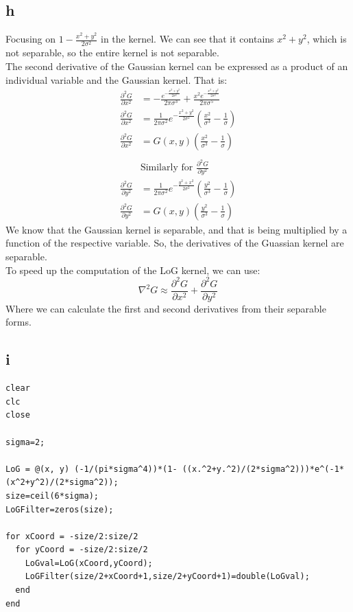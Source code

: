 \documentclass[11pt]{article}
\begin{document}
\subsection{h}
\label{sec:org1105e8e}
Focusing on \(1-\frac{x^2+y^2}{2\sigma^2}\) in the kernel. We can see that it contains \(x^2+y^2\), which is not separable, so the entire kernel is not separable. \\
The second derivative of the Gaussian kernel can be expressed as a product of an individual variable and the Gaussian kernel. That is:
\begin{align*}
\frac{\partial^2 G}{\partial x^2}&=-\frac{e^{-\frac{ x^{2} + y^2}{2 \sigma^{2}}}}{2 \pi \sigma^{3}} + \frac{x^{2} e^{-\frac{ x^{2} + y^2}{2 \sigma^{2}}}}{2 \pi \sigma^{5}} \\
\frac{\partial^2 G}{\partial x^2}&=\frac{1}{2\pi\sigma^2}e^{-\frac{x^2+y^2}{2\sigma^2}} \left( \frac{x^2}{\sigma^3}-\frac{1}{\sigma}\right) \\
\frac{\partial^2 G}{\partial x^2}&=G(x,y)\left( \frac{x^2}{\sigma^3}-\frac{1}{\sigma}\right) \\
& \\
& \textrm{Similarly for } \frac{\partial^2 G}{\partial y^2}\\
\frac{\partial^2 G}{\partial y^2}&=\frac{1}{2\pi\sigma^2}e^{-\frac{y^2+x^2}{2\sigma^2}} \left( \frac{y^2}{\sigma^3}-\frac{1}{\sigma}\right) \\
\frac{\partial^2 G}{\partial y^2}&=G(x,y)\left( \frac{y^2}{\sigma^3}-\frac{1}{\sigma}\right)
\end{align*}
We know that the Gaussian kernel is separable, and that is being multiplied by a function of the respective variable. So, the derivatives of the Guassian kernel are separable.\\
To speed up the computation of the LoG kernel, we can use:
\[\nabla^2 G\approx \frac{\partial^2 G}{\partial x^2} + \frac{\partial^2 G}{\partial y^2}\]
Where we can calculate the first and second derivatives from their separable forms.
\subsection{i}
\label{sec:orgea963d5}
\begin{verbatim}
clear
clc
close

sigma=2;

LoG = @(x, y) (-1/(pi*sigma^4))*(1- ((x.^2+y.^2)/(2*sigma^2)))*e^(-1*(x^2+y^2)/(2*sigma^2));
size=ceil(6*sigma);
LoGFilter=zeros(size);

for xCoord = -size/2:size/2
  for yCoord = -size/2:size/2
    LoGval=LoG(xCoord,yCoord);
    LoGFilter(size/2+xCoord+1,size/2+yCoord+1)=double(LoGval);
  end
end


\end{verbatim}
\end{document}
